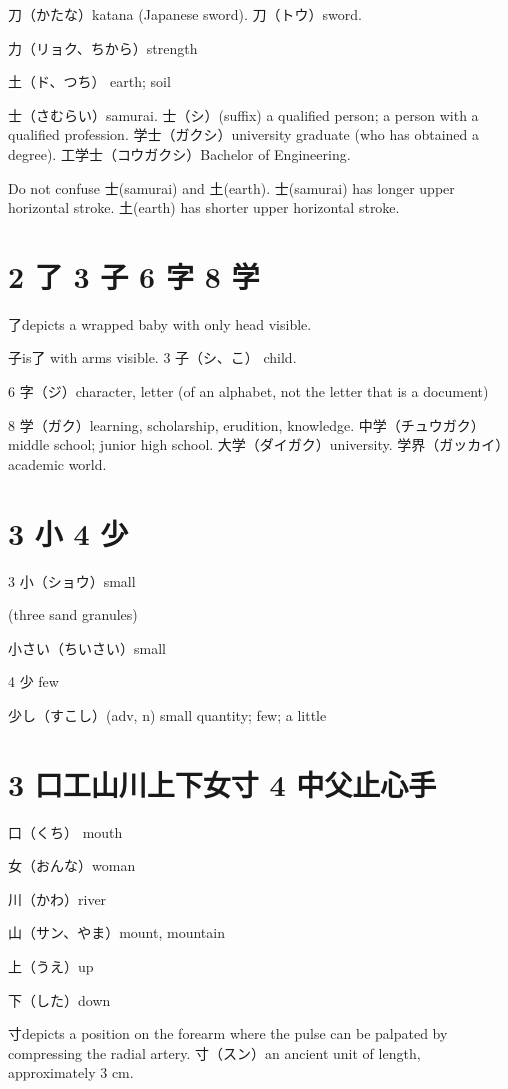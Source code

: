 刀（かたな）katana (Japanese sword).
刀（トウ）sword.

力（リョク、ちから）strength

土（ド、つち） earth; soil

士（さむらい）samurai.
士（シ）(suffix)
a qualified person;
a person with a qualified profession.
学士（ガクシ）university graduate (who has obtained a degree).
工学士（コウガクシ）Bachelor of Engineering.

Do not confuse 士(samurai) and 土(earth).
士(samurai) has longer upper horizontal stroke.
土(earth) has shorter upper horizontal stroke.

\section{2 了 3 子 6 字 8 学}

了depicts a wrapped baby with only head visible.

子is了 with arms visible.
3 子（シ、こ） child.

6 字（ジ）character, letter (of an alphabet, not the letter that is a document)

8 学（ガク）learning, scholarship, erudition, knowledge.
中学（チュウガク）middle school; junior high school.
大学（ダイガク）university.
学界（ガッカイ）academic world.

\section{3 小 4 少}

3 小（ショウ）small

(three sand granules)

小さい（ちいさい）small

4 少 few

少し（すこし）(adv, n) small quantity; few; a little

\section{3 口工山川上下女寸 4 中父止心手}

口（くち） mouth

女（おんな）woman

川（かわ）river

山（サン、やま）mount, mountain

上（うえ）up

下（した）down

寸depicts a position on the forearm
where the pulse can be palpated by compressing the radial artery.
寸（スン）an ancient unit of length, approximately 3 cm.

